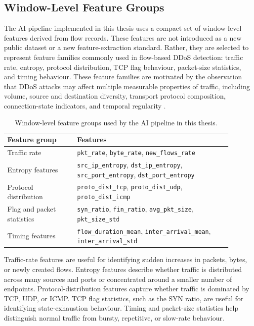 \documentclass[12pt, a4paper, reqno, oneside]{book}
\begin{document}
\subsection{Window-Level Feature Groups}
\label{subsec:window-features}

The AI pipeline implemented in this thesis uses a compact set of window-level
features derived from flow records. These features are not introduced as a new
public dataset or a new feature-extraction standard. Rather, they are selected
to represent feature families commonly used in flow-based DDoS detection:
traffic rate, entropy, protocol distribution, TCP flag behaviour, packet-size
statistics, and timing behaviour. These feature families are motivated by the
observation that DDoS attacks may affect multiple measurable properties of
traffic, including volume, source and destination diversity, transport
protocol composition, connection-state indicators, and temporal regularity
\cite{mirkovic2004taxonomy,hill2024ddos_sdn_survey,cicflowmeter_official}.

\begin{table}[htbp]
\centering
\caption{Window-level feature groups used by the AI pipeline in this thesis.}
\label{tab:window-feature-groups}
\begin{tabular}{p{0.28\linewidth} p{0.62\linewidth}}
\hline
\textbf{Feature group} & \textbf{Features} \\
\hline
Traffic rate &
\texttt{pkt\_rate}, \texttt{byte\_rate}, \texttt{new\_flows\_rate} \\

Entropy features &
\texttt{src\_ip\_entropy}, \texttt{dst\_ip\_entropy},
\texttt{src\_port\_entropy}, \texttt{dst\_port\_entropy} \\

Protocol distribution &
\texttt{proto\_dist\_tcp}, \texttt{proto\_dist\_udp},
\texttt{proto\_dist\_icmp} \\

Flag and packet statistics &
\texttt{syn\_ratio}, \texttt{fin\_ratio},
\texttt{avg\_pkt\_size}, \texttt{pkt\_size\_std} \\

Timing features &
\texttt{flow\_duration\_mean}, \texttt{inter\_arrival\_mean},
\texttt{inter\_arrival\_std} \\
\hline
\end{tabular}
\end{table}

Traffic-rate features are useful for identifying sudden increases in packets,
bytes, or newly created flows. Entropy features describe whether traffic is
distributed across many sources and ports or concentrated around a smaller
number of endpoints. Protocol-distribution features capture whether traffic is
dominated by TCP, UDP, or ICMP. TCP flag statistics, such as the SYN ratio, are
useful for identifying state-exhaustion behaviour. Timing and packet-size
statistics help distinguish normal traffic from bursty, repetitive, or
slow-rate behaviour.
\end{document}

